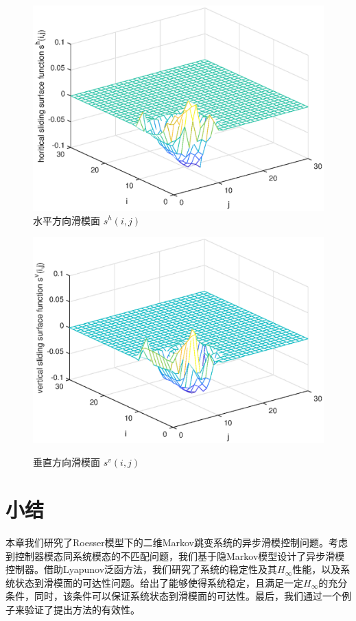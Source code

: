 	\begin{figure}[!htb]
		\centering\includegraphics[scale=0.6]{./figures/2dsmc/simulations/hs_eps.eps}
		\caption{水平方向滑模面 $s^{h}(i,j)$}
		\label{fig9}
	\end{figure}
	\begin{figure}[!htb]
		\centering\includegraphics[scale=0.6]{./figures/2dsmc/simulations/vs_eps.eps}\\ 
		\caption{垂直方向滑模面 $s^{v}(i,j)$}
		\label{fig10}
	\end{figure}

\section{小结} \label{conclusion} 	
	本章我们研究了Roesser模型下的二维Markov跳变系统的异步滑模控制问题。考虑到控制器模态同系统模态的不匹配问题，我们基于隐Markov模型设计了异步滑模控制器。借助Lyapunov泛函方法，我们研究了系统的稳定性及其$H_{\infty}$性能，以及系统状态到滑模面的可达性问题。给出了能够使得系统稳定，且满足一定$H_{\infty}$的充分条件，同时，该条件可以保证系统状态到滑模面的可达性。最后，我们通过一个例子来验证了提出方法的有效性。
	